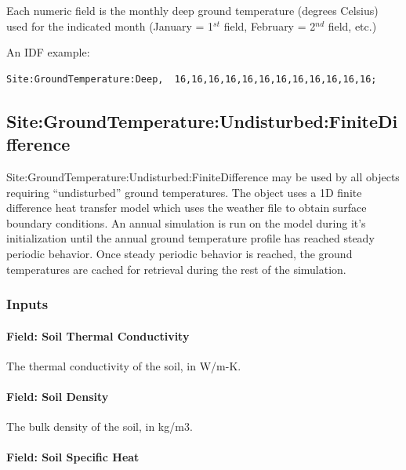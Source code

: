 Each numeric field is the monthly deep ground temperature (degrees Celsius) used for the indicated month (January = 1\(^{st}\) field, February = 2\(^{nd}\) field, etc.)

An IDF example:

\begin{lstlisting}
Site:GroundTemperature:Deep,  16,16,16,16,16,16,16,16,16,16,16,16;
\end{lstlisting}

\subsection{Site:GroundTemperature:Undisturbed:FiniteDifference}\label{sitegroundtemperatureundisturbedfinitedifference}

Site:GroundTemperature:Undisturbed:FiniteDifference may be used by all objects requiring ``undisturbed'' ground temperatures. The object uses a 1D finite difference heat transfer model which uses the weather file to obtain surface boundary conditions. An annual simulation is run on the model during it's initialization until the annual ground temperature profile has reached steady periodic behavior. Once steady periodic behavior is reached, the ground temperatures are cached for retrieval during the rest of the simulation.

\subsubsection{Inputs}\label{inputs-14-007}

\paragraph{Field: Soil Thermal Conductivity}\label{field-soil-thermal-conductivity-000}

The thermal conductivity of the soil, in W/m-K.

\paragraph{Field: Soil Density}\label{field-soil-density-000}

The bulk density of the soil, in kg/m3.

\paragraph{Field: Soil Specific Heat}\label{field-soil-specific-heat-000}

